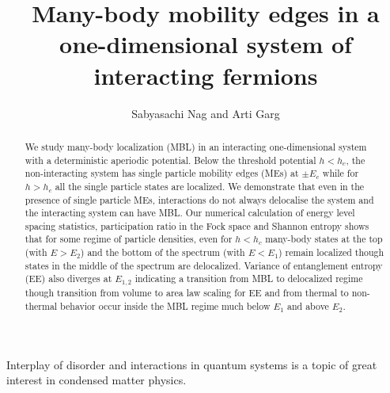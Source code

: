 \documentclass[prl,aps,twocolumn,floats,nofootinbib,showpacs]{revtex4}
\begin{document}
\renewcommand{\ni}{{\noindent}}
\newcommand{\dprime}{{\prime\prime}}
\newcommand{\be}{\begin{equation}}
\newcommand{\ee}{\end{equation}}
\newcommand{\bea}{\begin{eqnarray}} 
\newcommand{\eea}{\end{eqnarray}}
\newcommand{\la}{\langle}
\newcommand{\ra}{\rangle} 
\newcommand{\dg}{\dagger}
\newcommand\lbs{\left[}
\newcommand\rbs{\right]}
\newcommand\lbr{\left(}
\newcommand\rbr{\right)}
\newcommand\f{\frac}
\newcommand\e{\epsilon}
\newcommand\ua{\uparrow}
\newcommand\da{\downarrow}
\title{Many-body mobility edges in a one-dimensional system of interacting fermions}
\author{Sabyasachi Nag and Arti Garg} 
\vspace{0.2cm}
\begin{abstract}
\vspace{0.3cm}
We study many-body localization (MBL) in an interacting one-dimensional system with a deterministic aperiodic  potential. Below the threshold potential $h < h_c$, the non-interacting system has single particle mobility edges (MEs) at $\pm E_c$ while for $ h > h_c$ all the single particle states are localized. We demonstrate that even in the presence of single particle MEs, interactions do not always delocalise the system and the interacting system can have MBL. Our numerical calculation of energy level spacing statistics, participation ratio in the Fock space and Shannon entropy shows that for some regime of particle densities, even for $h < h_c$ many-body states at the top (with $E >E_2$) and the bottom of the spectrum (with $E< E_1$) remain localized though states in the middle of the spectrum are delocalized. Variance of entanglement entropy (EE) also diverges at $E_{1,2}$ indicating a transition from MBL to delocalized regime though transition from volume to area law scaling for EE and from thermal to non-thermal behavior occur inside the MBL regime much below $E_1$ and above $E_2$.
\vspace{0.cm}
\end{abstract} 
\maketitle
Interplay of disorder and interactions in quantum systems is a topic of great interest in condensed matter physics. 
\end{document}

